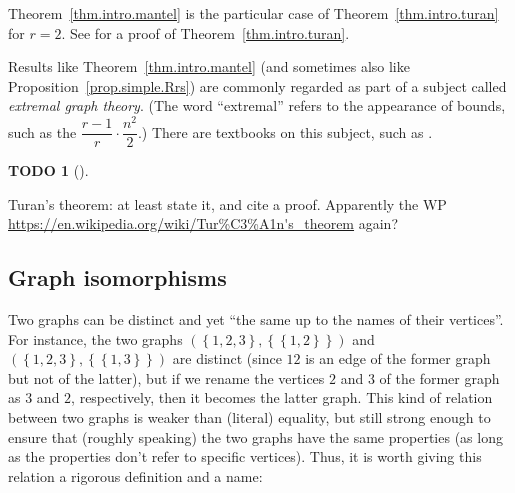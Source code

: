 \documentclass[numbers=enddot,12pt,final,onecolumn,notitlepage]{scrartcl}%
\theoremstyle{definition}
\newtheorem{quest}[theo]{TODO}
\newenvironment{todo}[1][]
{\begin{quest}[#1]\begin{leftbar}}
{\end{leftbar}\end{quest}}
\newcommand{\set}[1]{\left\{ #1 \right\}}
\newcommand{\tup}[1]{\left( #1 \right)}
\begin{document}
Theorem~\ref{thm.intro.mantel} is the particular case of
Theorem~\ref{thm.intro.turan} for $r = 2$. See
\cite[Chapter 4, Theorem 4.8]{Jukna11} for a proof of
Theorem~\ref{thm.intro.turan}.

Results like Theorem~\ref{thm.intro.mantel} (and sometimes also like
Proposition~\ref{prop.simple.Rrs}) are commonly regarded as part of
a subject called \textit{extremal graph theory}. (The word
``extremal'' refers to the appearance of bounds, such as the
$\dfrac{r-1}{r} \cdot \dfrac{n^2}{2}$.) There are textbooks on this
subject, such as \cite{Jukna11}.

\begin{todo}
Turan's theorem: at least state it, and cite a proof.
Apparently the WP
\url{https://en.wikipedia.org/wiki/Tur%C3%A1n's_theorem} again?
\end{todo}

\subsection{\label{sect.intro.iso}Graph isomorphisms}

Two graphs can be distinct and yet ``the same up to the names of their
vertices''. For instance, the two graphs
$\tup{\set{1,2,3},\set{\set{1,2}}}$ and
$\tup{\set{1,2,3},\set{\set{1,3}}}$ are distinct (since $12$ is an
edge of the former graph but not of the latter), but if we rename the
vertices $2$ and $3$ of the former graph as $3$ and $2$, respectively,
then it becomes the latter graph. This kind of relation between two
graphs is weaker than (literal) equality, but still strong enough to
ensure that (roughly speaking) the two graphs have the same properties
(as long as the properties don't refer to specific vertices). Thus,
it is worth giving this relation a rigorous definition and a name:
\end{document}
